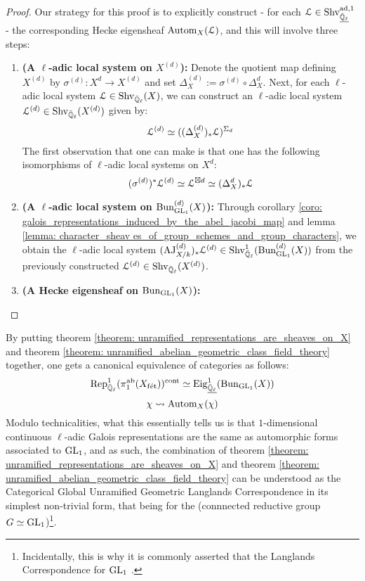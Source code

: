             \begin{proof}
                Our strategy for this proof is to explicitly construct - for each $\mathcal{L} \in \mathrm{Shv}_{\underline{\bar{\mathbb{Q}}_{\ell}}}^{\mathrm{ad}, 1}$ - the corresponding Hecke eigensheaf $\mathrm{Autom}_X(\mathcal{L})$, and this will involve three steps:
                    \begin{enumerate}
                        \item \textbf{(A $\ell$-adic local system on $X^{(d)}$):} Denote the quotient map defining $X^{(d)}$ by $\sigma^{(d)}: X^d \to X^{(d)}$ and set $\Delta_X^{(d)} := \sigma^{(d)} \circ \Delta_X^d$. Next, for each $\ell$-adic local system $\mathcal{L} \in \mathrm{Shv}_{\bar{\mathbb{Q}}_{\ell}}(X)$, we can construct an $\ell$-adic local system $\mathcal{L}^{(d)} \in \mathrm{Shv}_{\bar{\mathbb{Q}}_{\ell}}(X^{(d)})$ given by:
                            $$\mathcal{L}^{(d)} \simeq ((\Delta_X^{(d)})_*\mathcal{L})^{\Sigma_d}$$
                        The first observation that one can make is that one has the following isomorphisms of $\ell$-adic local systems on $X^d$:
                            $$(\sigma^{(d)})^*\mathcal{L}^{(d)} \simeq \mathcal{L}^{\boxtimes d} \simeq (\Delta_X^d)_*\mathcal{L}$$
                        \item \textbf{(A $\ell$-adic local system on $\mathrm{Bun}_{\operatorname{GL}_1}^{(d)}(X)$):} Through corollary \ref{coro: galois_representations_induced_by_the_abel_jacobi_map} and lemma \ref{lemma: character_sheav es_of_group_schemes_and_group_characters}, we obtain the $\ell$-adic local system $(\mathrm{AJ}_{X/k}^{(d)})_*\mathcal{L}^{(d)} \in \mathrm{Shv}^1_{\bar{\mathbb{Q}}_{\ell}}(\mathrm{Bun}_{\operatorname{GL}_1}^{(d)}(X))$ from the previously constructed $\mathcal{L}^{(d)} \in \mathrm{Shv}_{\bar{\mathbb{Q}}_{\ell}}(X^{(d)})$.
                        \item \textbf{(A Hecke eigensheaf on $\mathrm{Bun}_{\operatorname{GL}_1}(X)$):}
                    \end{enumerate}
            \end{proof}
        \begin{remark} \label{remark: unramified_abelian_geometric_class_field_theory_explanation}
            By putting theorem \ref{theorem: unramified_representations_are_sheaves_on_X} and theorem \ref{theorem: unramified_abelian_geometric_class_field_theory} together, one gets a canonical equivalence of categories as follows:
                $$\mathrm{Rep}_{\bar{\mathbb{Q}}_{\ell}}^1(\pi_1^{\mathrm{ab}}(X_{\mathrm{f\acute{e}t}}))^{\mathrm{cont}} \simeq \mathrm{Eig}_{\underline{\bar{\mathbb{Q}}_{\ell}}}^1(\mathrm{Bun}_{\operatorname{GL}_1}(X))$$
                $$\chi \leadsto \mathrm{Autom}_X(\chi)$$
            Modulo technicalities, what this essentially tells us is that $1$-dimensional continuous $\ell$-adic Galois representations are the same as automorphic forms associated to $\operatorname{GL}_1$, and as such, the combination of theorem \ref{theorem: unramified_representations_are_sheaves_on_X} and theorem \ref{theorem: unramified_abelian_geometric_class_field_theory} can be understood as the Categorical Global Unramified Geometric Langlands Correspondence in its simplest non-trivial form, that being for the (connnected reductive group $G \simeq \operatorname{GL}_1$)\footnote{Incidentally, this is why it is commonly asserted that the Langlands Correspondence for $\operatorname{GL}_1$ .}. 
        \end{remark}
        
